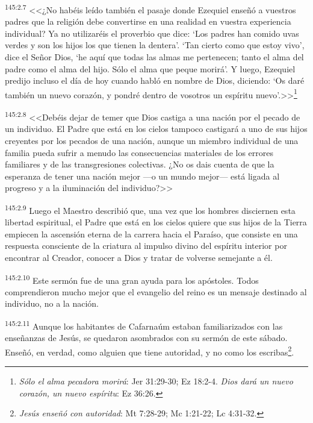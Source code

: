 \par 
\textsuperscript{145:2.7} <<¿No habéis leído también el pasaje donde Ezequiel enseñó a vuestros padres que la religión debe convertirse en una realidad en vuestra experiencia individual? Ya no utilizaréis el proverbio que dice: `Los padres han comido uvas verdes y son los hijos los que tienen la dentera'. `Tan cierto como que estoy vivo', dice el Señor Dios, `he aquí que todas las almas me pertenecen; tanto el alma del padre como el alma del hijo. Sólo el alma que peque morirá'. Y luego, Ezequiel predijo incluso el día de hoy cuando habló en nombre de Dios, diciendo: `Os daré también un nuevo corazón, y pondré dentro de vosotros un espíritu nuevo'.>>\footnote{\textit{Sólo el alma pecadora morirá}: Jer 31:29-30; Ez 18:2-4. \textit{Dios dará un nuevo corazón, un nuevo espíritu}: Ez 36:26.}

\par 
\textsuperscript{145:2.8} <<Debéis dejar de temer que Dios castiga a una nación por el pecado de un individuo. El Padre que está en los cielos tampoco castigará a uno de sus hijos creyentes por los pecados de una nación, aunque un miembro individual de una familia pueda sufrir a menudo las consecuencias materiales de los errores familiares y de las transgresiones colectivas. ¿No os dais cuenta de que la esperanza de tener una nación mejor ---o un mundo mejor--- está ligada al progreso y a la iluminación del individuo?>>

\par 
\textsuperscript{145:2.9} Luego el Maestro describió que, una vez que los hombres disciernen esta libertad espiritual, el Padre que está en los cielos quiere que sus hijos de la Tierra empiecen la ascensión eterna de la carrera hacia el Paraíso, que consiste en una respuesta consciente de la criatura al impulso divino del espíritu interior por encontrar al Creador, conocer a Dios y tratar de volverse semejante a él.

\par 
\textsuperscript{145:2.10} Este sermón fue de una gran ayuda para los apóstoles. Todos comprendieron mucho mejor que el evangelio del reino es un mensaje destinado al individuo, no a la nación.

\par 
\textsuperscript{145:2.11} Aunque los habitantes de Cafarnaúm estaban familiarizados con las enseñanzas de Jesús, se quedaron asombrados con su sermón de este sábado. Enseñó, en verdad, como alguien que tiene autoridad, y no como los escribas\footnote{\textit{Jesús enseñó con autoridad}: Mt 7:28-29; Mc 1:21-22; Lc 4:31-32.}.


